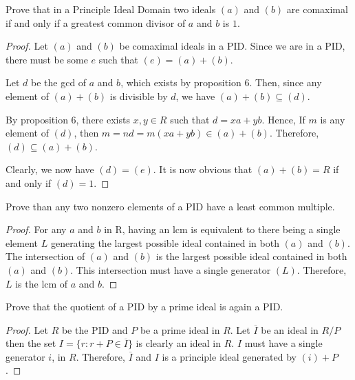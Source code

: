 \documentclass[10pt]{article}
\newenvironment{problem}[2][Problem]{\begin{trivlist}
		\item[\hskip \labelsep {\bfseries #1}\hskip \labelsep {\bfseries #2.}]}{\end{trivlist}}
\begin{document}
	\begin{problem}{2.1}
		Prove that in a Principle Ideal Domain two ideals $(a)$ and $(b)$ are comaximal if and only if a greatest common divisor of $a$ and $b$ is $1$.
		\begin{proof}
			Let $(a)$ and $(b)$ be comaximal ideals in a PID. Since we are in a PID, there must be some $e$ such that $(e) = (a) + (b)$. 
			
			Let $d$ be the gcd of $a$ and $b$, which exists by proposition 6. Then, since any element of $(a) + (b)$ is divisible by $d$, we have $(a) + (b) \subseteq (d)$. 
			
			By proposition 6, there exists $x,y \in R$ such that $d = xa+yb$. Hence, If $m$ is any element of $(d)$, then $m = nd = m(xa+yb) \in (a) + (b)$. Therefore, $(d) \subseteq (a) + (b)$.
			
			Clearly, we now have $(d) = (e)$. It is now obvious that $(a) + (b) = R$ if and only if $(d) = 1$. 
		\end{proof}
	\end{problem}
	
	\begin{problem}{2.2}
		Prove than any two nonzero elements of a PID have a least common multiple.
		\begin{proof}
			For any $a$ and $b$ in R, having an lcm is equivalent to there being a single element $L$ generating the largest possible ideal contained in both $(a)$ and $(b)$. The intersection of $(a)$ and $(b)$ is the largest possible ideal contained in both $(a)$ and $(b)$. This intersection must have a single generator $(L)$. Therefore, $L$ is the lcm of $a$ and $b$. 
		\end{proof}
	\end{problem}
	
	\begin{problem}{2.3}
		Prove that the quotient of a PID by a prime ideal is again a PID.
		\begin{proof}
			Let $R$ be the PID and $P$ be a prime ideal in $R$. Let $\overline{I}$ be an ideal in $R/P$ then the set $I = \{r : r + P \in \overline{I}\}$ is clearly an ideal in $R$. $I$ must have a single generator $i$, in $R$. Therefore, $\overline{I}$ and $I$ is a principle ideal generated by $(i) + P$. 
		\end{proof}
	\end{problem}
	
\end{document}
